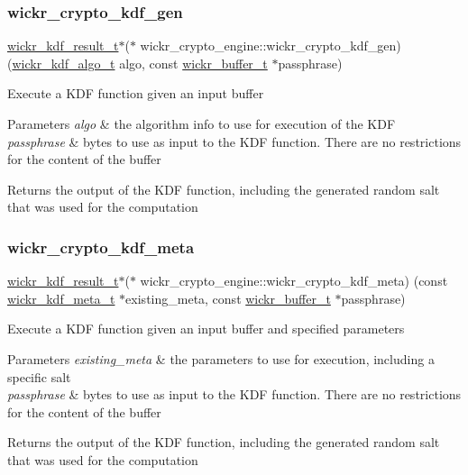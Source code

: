 \subsubsection{\texorpdfstring{wickr\_crypto\_kdf\_gen}{wickr\_crypto\_kdf\_gen}}
{\footnotesize\ttfamily \mbox{\hyperlink{structwickr__kdf__result}{wickr\+\_\+kdf\+\_\+result\+\_\+t}}$\ast$($\ast$ wickr\+\_\+crypto\+\_\+engine\+::wickr\+\_\+crypto\+\_\+kdf\+\_\+gen) (\mbox{\hyperlink{structwickr__kdf__algo}{wickr\+\_\+kdf\+\_\+algo\+\_\+t}} algo, const \mbox{\hyperlink{structwickr__buffer}{wickr\+\_\+buffer\+\_\+t}} $\ast$passphrase)}

Execute a K\+DF function given an input buffer


\begin{DoxyParams}{Parameters}
{\em algo} & the algorithm info to use for execution of the K\+DF \\
\hline
{\em passphrase} & bytes to use as input to the K\+DF function. There are no restrictions for the content of the buffer \\
\hline
\end{DoxyParams}
\begin{DoxyReturn}{Returns}
the output of the K\+DF function, including the generated random salt that was used for the computation 
\end{DoxyReturn}
\mbox{\label{group__wickr__crypto__engine_ga640cbc86ca36c4deb2c197de89dce7d1}} 
\subsubsection{\texorpdfstring{wickr\_crypto\_kdf\_meta}{wickr\_crypto\_kdf\_meta}}
{\footnotesize\ttfamily \mbox{\hyperlink{structwickr__kdf__result}{wickr\+\_\+kdf\+\_\+result\+\_\+t}}$\ast$($\ast$ wickr\+\_\+crypto\+\_\+engine\+::wickr\+\_\+crypto\+\_\+kdf\+\_\+meta) (const \mbox{\hyperlink{structwickr__kdf__meta}{wickr\+\_\+kdf\+\_\+meta\+\_\+t}} $\ast$existing\+\_\+meta, const \mbox{\hyperlink{structwickr__buffer}{wickr\+\_\+buffer\+\_\+t}} $\ast$passphrase)}

Execute a K\+DF function given an input buffer and specified parameters


\begin{DoxyParams}{Parameters}
{\em existing\+\_\+meta} & the parameters to use for execution, including a specific salt \\
\hline
{\em passphrase} & bytes to use as input to the K\+DF function. There are no restrictions for the content of the buffer \\
\hline
\end{DoxyParams}
\begin{DoxyReturn}{Returns}
the output of the K\+DF function, including the generated random salt that was used for the computation 
\end{DoxyReturn}
